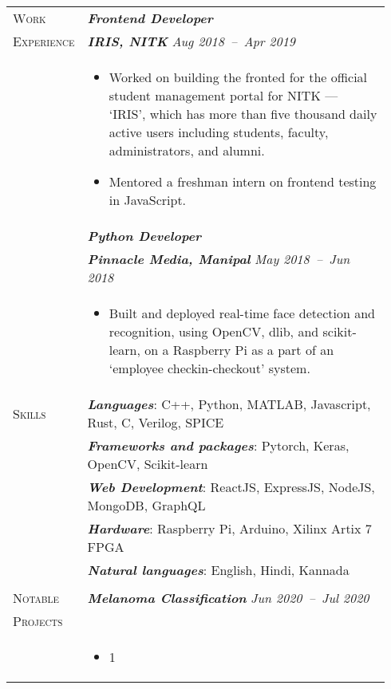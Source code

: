 \documentclass[letterpaper, 10pt, oneside]{article}
\newcommand{\stitle}[1]{\normalsize{\textsc{#1}}}
\newcommand{\bdit}[1]{\textit{\textbf{#1}}}
\begin{document}
\begin{longtable}{@{} p{0.14\linewidth} p{0.8\linewidth}}
\stitle{Work}       & \bdit{Frontend Developer} \\
\stitle{Experience} & \bdit{IRIS, NITK} \hfill \textit{Aug 2018\ --\ Apr 2019} \\
                    & \parbox{0.8\textwidth}{
                        \begin{itemize}[leftmargin=*, itemsep=-0.88ex]
                            \item Worked on building the fronted for the official student management portal for NITK --- `IRIS', which has more than five thousand
                                  daily active users including students, faculty, administrators, and alumni.
                            \item Mentored a freshman intern on frontend testing in JavaScript.
                        \end{itemize}
                    }
\\
                    & \bdit{Python Developer} \\
                    & \bdit{Pinnacle Media, Manipal} \hfill \textit{May 2018\ --\ Jun 2018} \\
                    & \parbox{0.8\textwidth}{
                        \begin{itemize}[leftmargin=*, itemsep=-0.88ex]
                            \item Built and deployed real-time face detection and recognition, using OpenCV, dlib, and scikit-learn, on a Raspberry Pi
                                  as a part of an `employee checkin-checkout' system.
                        \end{itemize}
                    }
\\


\stitle{Skills} & \bdit{Languages}: C++, Python, MATLAB, Javascript, Rust, C, Verilog, SPICE \\
                & \bdit{Frameworks and packages}: Pytorch, Keras, OpenCV, Scikit-learn \\
                & \bdit{Web Development}: ReactJS, ExpressJS, NodeJS, MongoDB, GraphQL \\
                & \bdit{Hardware}: Raspberry Pi, Arduino, Xilinx Artix 7 FPGA \\
                & \bdit{Natural languages}: English, Hindi, Kannada \\
\\


\newpage
\stitle{Notable}  & \bdit{Melanoma Classification} \hfill \textit{Jun 2020\ --\ Jul 2020} \\
\stitle{Projects} & \\
                  & \parbox{0.8\textwidth}{
                        \begin{itemize}[leftmargin=*, itemsep=-0.88ex, topsep=-0.1ex]
                            \item 1
                        \end{itemize}
                    }


\end{longtable}
\end{document}
